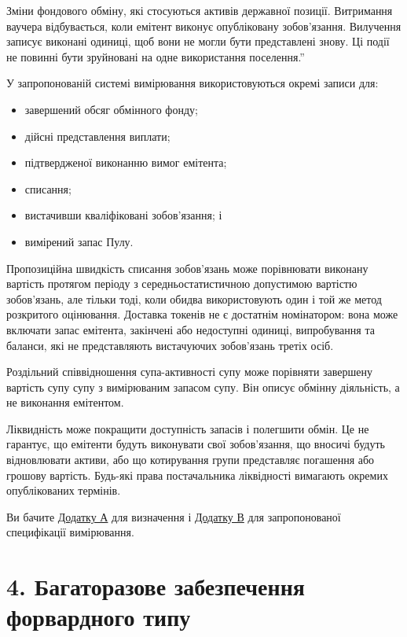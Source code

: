\documentclass[11pt]{article}
\begin{document}
Зміни фондового обміну, які стосуються активів державної позиції. Витримання ваучера відбувається, коли емітент виконує опубліковану зобов'язання. Вилучення записує виконані одиниці, щоб вони не могли бути представлені знову. Ці події не повинні бути зруйновані на одне використання поселення.''

У запропонованій системі вимірювання використовуються окремі записи для:

\begin{itemize}[leftmargin=*]
\item завершений обсяг обмінного фонду;
\item дійсні представлення виплати;
\item підтвердженої виконанню вимог емітента;
\item списання;
\item вистачивши кваліфіковані зобов'язання; і
\item вимірений запас Пулу.
\end{itemize}
Пропозиційна швидкість списання зобов'язань може порівнювати виконану вартість протягом періоду з середньостатистичною допустимою вартістю зобов'язань, але тільки тоді, коли обидва використовують один і той же метод розкритого оцінювання. Доставка токенів не є достатнім номінатором: вона може включати запас емітента, закінчені або недоступні одиниці, випробування та баланси, які не представляють вистачуючих зобов'язань третіх осіб.

Роздільний співвідношення супа-активності супу може порівняти завершену вартість супу супу з вимірюваним запасом супу. Він описує обмінну діяльність, а не виконання емітентом.

Ліквидність може покращити доступність запасів і полегшити обмін. Це не гарантує, що емітенти будуть виконувати свої зобов'язання, що вносичі будуть відновлювати активи, або що котирування групи представляє погашення або грошову вартість. Будь-які права постачальника ліквідності вимагають окремих опублікованих термінів.

Ви бачите \href{https://docs.cosmolocal.credit/uk/white-paper/appendix-a-math-box}{Додатку А} для визначення і \href{https://docs.cosmolocal.credit/uk/white-paper/appendix-c-kpi-definitions}{Додатку В} для запропонованої специфікації вимірювання.


\section*{4. Багаторазове забезпечення форвардного типу}
\end{document}
